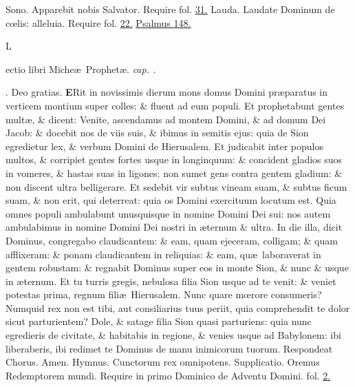 \documentclass[letter,11pt]{book}
\makeatletter
\DeclareRobustCommand{\Rbar}{\vers@resp{0pt}{R}}
\newcommand{\vers@resp@sym}{\raisebox{0.2ex}{\rotatebox[origin=c]{-20}{$\m@th\rceil$}}}
\newcommand{\vers@resp}[2]{%
  {\ooalign{\hidewidth\kern#1\vers@resp@sym\hidewidth\cr#2\cr}}%
}%
\def\R{\color{Red} \Rbar . \color{black}}
\makeatother
\begin{document}
\begin{multicols}{2}
\newline \color{Red} Sono. \color{black} Apparebit nobis Salvator. \color{Red} Require fol. \color{black} \hyperlink{DOM-QUINTO-ADV-VES}{31.}
\newline \color{Red} Lauda. \color{black} Laudate Dominum de c\oe lis: alleluia. \color{Red} Require fol. \color{black} \hyperlink{page.22}{22.} \color{Red} \hyperlink{ps148}{Psalmus 148.} \color{black}
\vspace{-.5em} \begin{center} \hypertarget{micheas.4} {\color{Red} L}ectio libri Miche\ae \ Prophet\ae . \itshape cap. . \color{black} \end{center} \vspace{-.5em}
\par \noindent \R Deo gratias.
\lettrine[lines=2]{\bfseries \color{Red} E}{}Rit in novissimis dierum mons domus Domini pr\ae paratus in verticem montium super colles: \& fluent ad eum populi. Et prophetabunt gentes mult\ae , \& dicent: Venite, ascendamus ad montem Domini, \& ad domum Dei Jacob: \& docebit nos de viis suis, \& ibimus in semitis ejus: quia de Sion egredietur lex, \& verbum Domini de Hierusalem. Et judicabit inter populos multos, \& corripiet gentes fortes usque in longinquum: \& concident gladios suos in vomeres, \& hastas suas in ligones: non sumet gens contra gentem gladium: \& non discent ultra belligerare. Et sedebit vir subtus vineam suam, \& subtus ficum suam, \& non erit, qui deterreat: quia os Domini exercituum locutum est. Quia omnes populi ambulabunt unusquisque in nomine Domini Dei sui: nos autem ambulabimus in nomine Domini Dei nostri in \ae ternum \& ultra. In die illa, dicit Dominus, congregabo claudicantem: \& eam, quam ejeceram, colligam; \& quam afflixeram: \& ponam claudicantem in reliquias: \& eam, qu\ae \ laboraverat in gentem robustam: \& regnabit Dominus super eos in monte Sion, \& nunc \& usque in \ae ternum. Et tu turris gregis, nebulosa filia Sion usque ad te venit: \& veniet potestas prima, regnum fili\ae \ Hierusalem. Nunc quare m\oe rore consumeris? Numquid rex non est tibi, aut consiliarius tuus periit, quia comprehendit te dolor sicut parturientem? Dole, \& satage filia Sion quasi parturiens: quia nunc egredieris de civitate, \& habitabis in regione, \& venies usque ad Babylonem: ibi liberaberis, ibi redimet te Dominus de manu inimicorum tuorum. \color{Red} Respondeat Chorus. \color{black} Amen.
\newline \color{Red} Hymnus. \color{black} Cunctorum rex omnipotens. \color{Red} Supplicatio. \color{black} Oremus Redemptorem mundi. \color{Red} Require in primo Dominico de Adventu Domini. fol. \color{black} \hyperlink{page.2}{2.}

\end{multicols}
\end{document}
